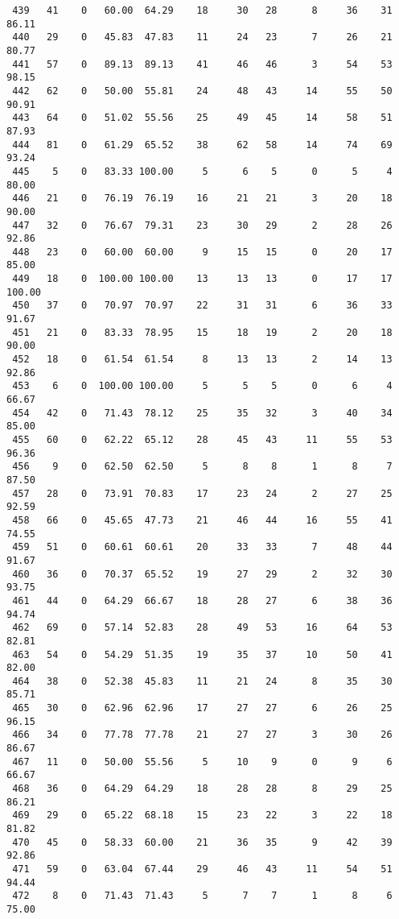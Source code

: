 \begin{verbatim}
 439   41    0   60.00  64.29    18     30   28      8     36    31    86.11
 440   29    0   45.83  47.83    11     24   23      7     26    21    80.77
 441   57    0   89.13  89.13    41     46   46      3     54    53    98.15
 442   62    0   50.00  55.81    24     48   43     14     55    50    90.91
 443   64    0   51.02  55.56    25     49   45     14     58    51    87.93
 444   81    0   61.29  65.52    38     62   58     14     74    69    93.24
 445    5    0   83.33 100.00     5      6    5      0      5     4    80.00
 446   21    0   76.19  76.19    16     21   21      3     20    18    90.00
 447   32    0   76.67  79.31    23     30   29      2     28    26    92.86
 448   23    0   60.00  60.00     9     15   15      0     20    17    85.00
 449   18    0  100.00 100.00    13     13   13      0     17    17   100.00
 450   37    0   70.97  70.97    22     31   31      6     36    33    91.67
 451   21    0   83.33  78.95    15     18   19      2     20    18    90.00
 452   18    0   61.54  61.54     8     13   13      2     14    13    92.86
 453    6    0  100.00 100.00     5      5    5      0      6     4    66.67
 454   42    0   71.43  78.12    25     35   32      3     40    34    85.00
 455   60    0   62.22  65.12    28     45   43     11     55    53    96.36
 456    9    0   62.50  62.50     5      8    8      1      8     7    87.50
 457   28    0   73.91  70.83    17     23   24      2     27    25    92.59
 458   66    0   45.65  47.73    21     46   44     16     55    41    74.55
 459   51    0   60.61  60.61    20     33   33      7     48    44    91.67
 460   36    0   70.37  65.52    19     27   29      2     32    30    93.75
 461   44    0   64.29  66.67    18     28   27      6     38    36    94.74
 462   69    0   57.14  52.83    28     49   53     16     64    53    82.81
 463   54    0   54.29  51.35    19     35   37     10     50    41    82.00
 464   38    0   52.38  45.83    11     21   24      8     35    30    85.71
 465   30    0   62.96  62.96    17     27   27      6     26    25    96.15
 466   34    0   77.78  77.78    21     27   27      3     30    26    86.67
 467   11    0   50.00  55.56     5     10    9      0      9     6    66.67
 468   36    0   64.29  64.29    18     28   28      8     29    25    86.21
 469   29    0   65.22  68.18    15     23   22      3     22    18    81.82
 470   45    0   58.33  60.00    21     36   35      9     42    39    92.86
 471   59    0   63.04  67.44    29     46   43     11     54    51    94.44
 472    8    0   71.43  71.43     5      7    7      1      8     6    75.00

\end{verbatim}
